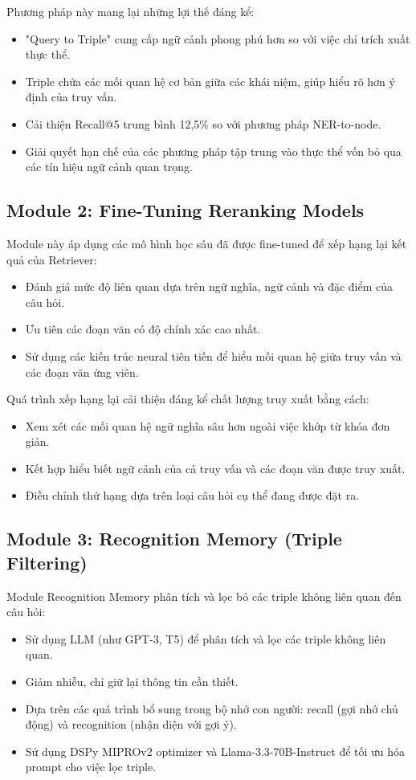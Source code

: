 \documentclass[../main.tex]{subfiles}
\begin{document}
Phương pháp này mang lại những lợi thế đáng kể:
\begin{itemize}
\item "Query to Triple" cung cấp ngữ cảnh phong phú hơn so với việc chỉ trích xuất thực thể.
\item Triple chứa các mối quan hệ cơ bản giữa các khái niệm, giúp hiểu rõ hơn ý định của truy vấn.
\item Cải thiện Recall@5 trung bình 12,5\% so với phương pháp NER-to-node.
\item Giải quyết hạn chế của các phương pháp tập trung vào thực thể vốn bỏ qua các tín hiệu ngữ cảnh quan trọng.
\end{itemize}

\subsection{Module 2: Fine-Tuning Reranking Models}
Module này áp dụng các mô hình học sâu đã được fine-tuned để xếp hạng lại kết quả của Retriever:

\begin{itemize}
\item Đánh giá mức độ liên quan dựa trên ngữ nghĩa, ngữ cảnh và đặc điểm của câu hỏi.
\item Ưu tiên các đoạn văn có độ chính xác cao nhất.
\item Sử dụng các kiến trúc neural tiên tiến để hiểu mối quan hệ giữa truy vấn và các đoạn văn ứng viên.
\end{itemize}

Quá trình xếp hạng lại cải thiện đáng kể chất lượng truy xuất bằng cách:
\begin{itemize}
\item Xem xét các mối quan hệ ngữ nghĩa sâu hơn ngoài việc khớp từ khóa đơn giản.
\item Kết hợp hiểu biết ngữ cảnh của cả truy vấn và các đoạn văn được truy xuất.
\item Điều chỉnh thứ hạng dựa trên loại câu hỏi cụ thể đang được đặt ra.
\end{itemize}

\subsection{Module 3: Recognition Memory (Triple Filtering)}
Module Recognition Memory phân tích và lọc bỏ các triple không liên quan đến câu hỏi:

\begin{itemize}
\item Sử dụng LLM (như GPT-3, T5) để phân tích và lọc các triple không liên quan.
\item Giảm nhiễu, chỉ giữ lại thông tin cần thiết.
\item Dựa trên các quá trình bổ sung trong bộ nhớ con người: recall (gợi nhớ chủ động) và recognition (nhận diện với gợi ý).
\item Sử dụng DSPy MIPROv2 optimizer và Llama-3.3-70B-Instruct để tối ưu hóa prompt cho việc lọc triple.
\end{itemize}
\end{document}
